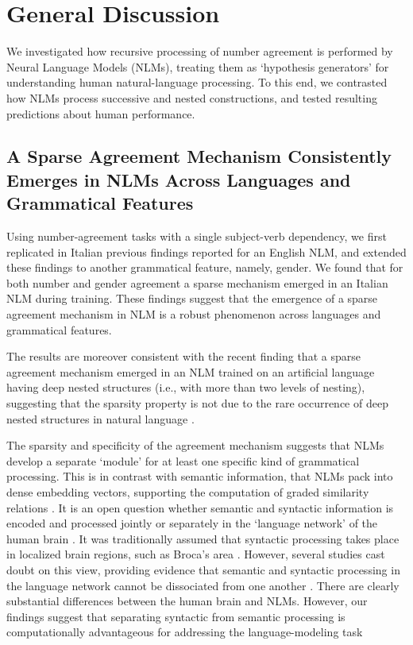 \section{General Discussion}
We investigated how recursive processing of number agreement is performed by Neural Language Models (NLMs), treating them as `hypothesis generators' for understanding human natural-language processing. To this end, we contrasted how NLMs process successive and nested constructions, and tested resulting predictions about human performance. 

\subsection{A Sparse Agreement Mechanism Consistently Emerges in NLMs Across Languages and Grammatical Features}
Using number-agreement tasks with a single subject-verb dependency, we first replicated in Italian previous findings reported for an English NLM, and extended these findings to another grammatical feature, namely, gender. We found that for both number and gender agreement a sparse mechanism emerged in an Italian NLM during training. These findings suggest that the emergence of a sparse agreement mechanism in NLM is a robust phenomenon across languages and grammatical features. 

The results are moreover consistent with the recent finding that a sparse agreement mechanism emerged in an NLM trained on an artificial language having deep nested structures (i.e., with more than two levels of nesting), suggesting that the sparsity property is not due to the rare occurrence of deep nested structures in natural language \citep{lakretz2020recursion}. 

The sparsity and specificity of the agreement mechanism suggests that NLMs develop a separate `module' for at least one specific kind of grammatical processing. This is in contrast with semantic information, that NLMs pack into dense embedding vectors, supporting the computation of graded similarity relations \citep{Mikolov:etal:2013a,Jurafsky:Martin:2020}. It is an open question whether semantic and syntactic information is encoded and processed jointly or separately in the `language network' of the human brain \citep{pallier2011cortical}. It was traditionally assumed that syntactic processing takes place in localized brain regions, such as Broca's area \citep[e.g.,][]{dapretto1999form}. However, several studies cast doubt on this view, providing evidence that semantic and syntactic processing in the language network cannot be dissociated from one another \citep{mollica2018high, siegelman2019attempt, fedorenko2020lack}. There are clearly substantial differences between the human brain and NLMs. However, our findings suggest that separating syntactic from semantic processing is computationally advantageous for addressing the language-modeling task \citep[][for related studies.]{ullman2004contributions, o2006biologically, russin2019reilly} 

